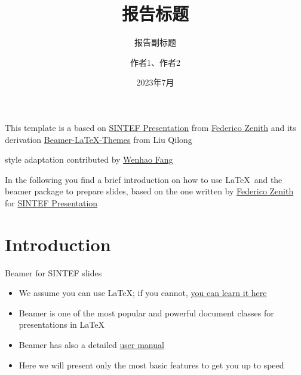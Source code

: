 \documentclass{beamer}
\title{报告标题}
\subtitle{报告副标题}
\author{作者1、作者2}
\date{2023年7月}
\newcommand{\hrefcol}[2]{\textcolor{cyan}{\href{#1}{#2}}}
\begin{document}
\maketitle

\begin{frame}

This template is a based on \hrefcol{https://www.overleaf.com/latex/templates/sintef-presentation/jhbhdffczpnx}{SINTEF Presentation} from \hrefcol{mailto:federico.zenith@sintef.no}{Federico Zenith} and its derivation \hrefcol{https://github.com/TOB-KNPOB/Beamer-LaTeX-Themes}{Beamer-LaTeX-Themes} from Liu Qilong

\vspace{\baselineskip}

 style adaptation contributed by \hrefcol{https://github.com/FangWHao}{Wenhao Fang}

\vspace{\baselineskip}

In the following you find a brief introduction on how to use \LaTeX\ and the beamer package to prepare slides, based on the one written by \hrefcol{mailto:federico.zenith@sintef.no}{Federico Zenith} for \hrefcol{https://www.overleaf.com/latex/templates/sintef-presentation/jhbhdffczpnx}{SINTEF Presentation}


\end{frame}

\section{Introduction}

\begin{frame}{Beamer for SINTEF slides}
\begin{itemize}
\item We assume you can use \LaTeX; if you cannot,
\hrefcol{http://en.wikibooks.org/wiki/LaTeX/}{you can learn it here}
\item Beamer is one of the most popular and powerful document
classes for presentations in \LaTeX
\item Beamer has also a detailed
\hrefcol{http://www.ctan.org/tex-archive/macros/latex/contrib/beamer/doc/beameruserguide.pdf}{user
 manual}
\item Here we will present only the most basic features to get you up to speed
\end{itemize}
\end{frame}
\end{document}
